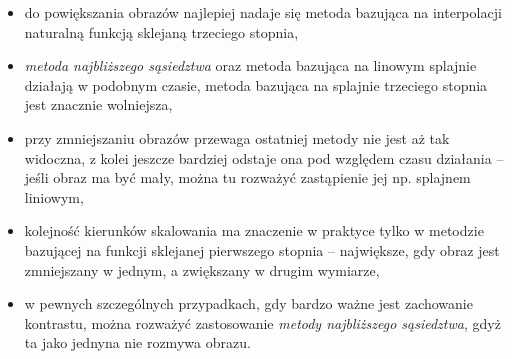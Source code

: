 \documentclass{article}
\begin{document}
\begin{itemize}
    \item do powiększania obrazów najlepiej nadaje się metoda bazująca na interpolacji naturalną funkcją sklejaną trzeciego stopnia,
    \item \textit{metoda najbliższego sąsiedztwa} oraz metoda bazująca na linowym splajnie działają w podobnym czasie, metoda bazująca na splajnie trzeciego stopnia jest znacznie wolniejsza,
    \item przy zmniejszaniu obrazów przewaga ostatniej metody nie jest aż tak widoczna, z kolei jeszcze bardziej odstaje ona pod względem czasu działania -- jeśli obraz ma być mały, można tu rozważyć zastąpienie jej np. splajnem liniowym,
    \item kolejność kierunków skalowania ma znaczenie w praktyce tylko w metodzie bazującej na funkcji sklejanej pierwszego stopnia -- największe, gdy obraz jest zmniejszany w jednym, a zwiększany w drugim wymiarze,
    \item w pewnych szczególnych przypadkach, gdy bardzo ważne jest zachowanie kontrastu, można rozważyć zastosowanie \textit{metody najbliższego sąsiedztwa}, gdyż ta jako jednyna nie rozmywa obrazu.
\end{itemize}
\end{document}
